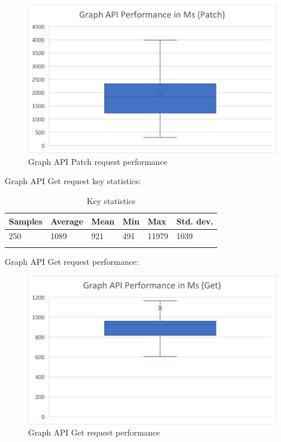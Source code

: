 \begin{figure}[h!]
  \includegraphics[scale=0.5]{Report/Figures/Graph API Patch request performance.jpg}
  \caption{Graph API Patch request performance}
  \label{fig: Graph API Patch request performance}
\end{figure}


Graph API Get request key statistics:

\begin{longtable}[]{@{}llllll@{}}
\toprule
Samples & Average & Mean & Min & Max & Std. dev.\tabularnewline
\midrule
\endhead
250 & 1089 & 921 & 491 & 11979 & 1039\tabularnewline
\bottomrule
\caption{Key statistics}
\label{Required API permissions}
\end{longtable}

Graph API Get request performance:

\begin{figure}[h!]
  \includegraphics[scale=0.5]{Report/Figures/Graph API Get request performance.jpg}
  \caption{Graph API Get request performance}
  \label{fig: Graph API Get request performance}
\end{figure}















